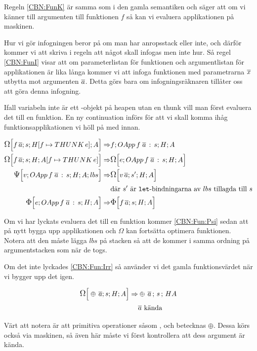 \documentclass[../Optimise]{subfiles}
\begin{document}
Regeln \eqref{CBN:FunK} är samma som i den gamla semantiken och säger att om vi känner till
argumenten till funktionen $f$ så kan vi evaluera applikationen på maskinen. 

Hur vi gör infogningen beror på om man har anropsstack eller inte, och därför kommer vi
att skriva i regeln att något skall infogas men inte hur. Så regel \eqref{CBN:FunI}
visar att om parameterlistan för funktionen och argumentlistan för applikationen är
lika långa kommer vi att infoga funktionen med parametrarna $\many{x}$ utbytta mot
argumenten $\many{a}$. Detta görs bara om infogningsräknaren tillåter oss att göra 
denna infogning.

Ifall variabeln inte är ett -objekt på heapen utan en thunk vill man först evaluera
det till en funktion. En ny continuation  införs för att vi skall komma ihåg
funktionsapplikationen vi höll på med innan.

\begin{align}
\CBNOMEGA s{\heap f{\THUNK e}}A{f\, \many{a}}  \Rightarrow & \CBNMC f{\cOApp f{\many{a}}s}HA\\
\CBNOMEGA sH{\abyss f{\THUNK e}}{f\, \many{a}}  \Rightarrow & \CBNOMEGA{\cOApp f{\many{a}}s}HAe\\
\label{CBN:Fun:Psi}\CBNPSI{\cOApp f{\many{a}}s}HA{lbs}v  \Rightarrow & \CBNOMEGA {s'}HA{v\, \many{a}} \\
 & \text{där } s' \text{ är \kw{let}-bindningarna av } lbs \text{ tillagda till } s \nonumber \\
\label{CBN:Fun:Irr}\CBNIRR {\cOApp f {\many{a}}s}HAe  \Rightarrow & \CBNIRR sHA{f\, \many{a}}
\end{align}

Om vi har lyckats evaluera det till en funktion kommer \eqref{CBN:Fun:Psi} sedan att
på nytt bygga upp applikationen och $\Omega$ kan fortsätta optimera funktionen.
Notera att den måste lägga $lbs$ på stacken så att de kommer i samma ordning på 
argumentstacken som när de togs.

Om det inte lyckades \eqref{CBN:Fun:Irr} så använder vi det gamla funktionsvärdet
när vi bygger upp det igen.

\begin{align}
\CBNOMEGA sHA{\oplus\, \many{a}}  \Rightarrow & \mc{\oplus\, \many{a}}sHA \\
 & \many{a} \text{ kända } \nonumber
\end{align}

Värt att notera är att primitiva operationer såsom \ic{+\#}, \ic{*\#} och \ic{==\#} betecknas $\oplus$. 
Dessa körs också via maskinen, så även här måste vi först kontrollera att dess argument
är kända.
\end{document}

